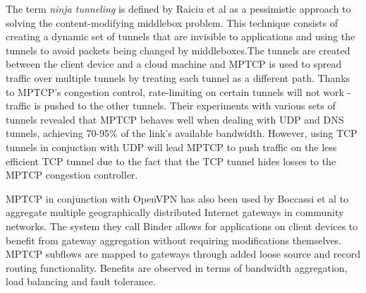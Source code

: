 
The term \textit{ninja tunneling} is defined by Raiciu et al \cite{goodcop} as a pessimistic approach to solving the content-modifying middlebox problem. This technique consists of creating a dynamic set of tunnels that are invisible to applications and using the tunnels to avoid packets being changed by middleboxes.The tunnels are created between the client device and a cloud machine and MPTCP is used to spread traffic over multiple tunnels by treating each tunnel as a different path. Thanks to MPTCP's congestion control, rate-limiting on certain tunnels will not work - traffic is pushed to the other tunnels. Their experiments with various sets of tunnels revealed that MPTCP behaves well when dealing with UDP and DNS tunnels, achieving 70-95\% of the link's available bandwidth. However, using TCP tunnels in conjuction with UDP will lead MPTCP to push traffic on the less efficient TCP tunnel due to the fact that the TCP tunnel hides losses to the MPTCP congestion controller.

MPTCP in conjunction with OpenVPN has also been used by Boccassi et al \cite{binder} to aggregate multiple geographically distributed Internet gateways in community networks. The system they call Binder allows for applications on client devices to benefit from gateway aggregation without requiring modifications themselves. MPTCP subflows are mapped to gateways through added loose source and record routing functionality. Benefits are observed in terms of bandwidth aggregation, load balancing and fault tolerance.

